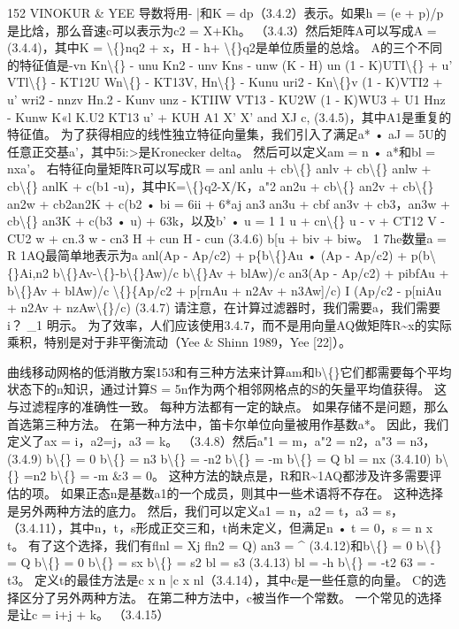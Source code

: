 \documentclass[UTF8,11pt,a4paper,openany,fontset=fandol]{ctexbook}
\begin{document}
152 VINOKUR \& YEE 导数将用- |和K = dp（3.4.2）表示。如果h = (e + p)/p是比焓，那么音速c可以表示为c2 = X+Kh。 （3.4.3）然后矩阵A可以写成A = (3.4.4)，其中K = \textbackslash\{\}nq2 + x，H - h+ \textbackslash\{\}q2是单位质量的总焓。 A的三个不同的特征值是-vn Kn\textbackslash\{\} - unu Kn2 - unv Kns - unw (K - H) un (1 - K)UTI\textbackslash\{\} + u' VTl\textbackslash\{\} - KT12U Wn\textbackslash\{\} - KT13V, Hn\textbackslash\{\} - Kunu uri2 - Kn\textbackslash\{\}v (1 - K)VTI2 + u' wri2 - nnzv Hn.2 - Kunv unz - KTIIW VT13 - KU2W (1 - K)WU3 + U1 Hnz - Kunw K«l K.U2 KT13 u' + KUH A1 X' X' and XJ c, (3.4.5)，其中A1是重复的特征值。 为了获得相应的线性独立特征向量集，我们引入了满足a* • aJ = 5U的任意正交基a'，其中5i:>是Kronecker delta。 然后可以定义am = n • a*和bl = nxa'。 右特征向量矩阵R可以写成R = anl anlu + cb\textbackslash\{\} anlv + cb\textbackslash\{\} anlw + cb\textbackslash\{\} anlK + c(b1 -u)，其中K=\textbackslash\{\}q2-X/K，a"2 an2u + cb\textbackslash\{\} an2v + cb\textbackslash\{\} an2w + cb2an2K + c(b2 • bi = 6ii + 6*aj an3 an3u + cbf an3v + cb3，an3w + cb\textbackslash\{\} an3K + c(b3 • u) + 63k，以及b' • u = 1 1 u + cn\textbackslash\{\} u - v + CT12 V - CU2 w + cn.3 w - cn3 H + cun H - cun (3.4.6) b[u + biv + biw。 1 7he数量a = R 1AQ最简单地表示为a anl(Ap - Ap/c2) + p\{b\textbackslash\{\}Au • (Ap - Ap/c2) + p(b\textbackslash\{\}Ai,n2 b\textbackslash\{\}Av-\textbackslash\{\}-b\textbackslash\{\}Aw)/c b\textbackslash\{\}Av + blAw)/c an3(Ap - Ap/c2) + pibfAu + b\textbackslash\{\}Av + blAw)/c \textbackslash\{\}\{Ap/c2 + p[rnAu + n2Av + n3Aw]/c) I (Ap/c2 - p[niAu + n2Av + nzAw\textbackslash\{\}/c) (3.4.7) 请注意，在计算过滤器时，我们需要a，我们需要i？ \_1 明示。 为了效率，人们应该使用3.4.7，而不是用向量AQ做矩阵R\textasciitilde{}x的实际乘积，特别是对于非平衡流动（Yee \& Shinn 1989，Yee [22]）。

曲线移动网格的低消散方案153和有三种方法来计算am和b\textbackslash\{\}它们都需要每个平均状态下的n知识，通过计算S = 5n作为两个相邻网格点的S的矢量平均值获得。 这与过滤程序的准确性一致。 每种方法都有一定的缺点。 如果存储不是问题，那么首选第三种方法。 在第一种方法中，笛卡尔单位向量被用作基数a*。 因此，我们定义了ax = i，a2=j，a3 = k。 （3.4.8）然后a"1 = m，a"2 = n2，a"3 = n3，(3.4.9) b\textbackslash\{\} = 0 b\textbackslash\{\} = n3 b\textbackslash\{\} = -n2 b\textbackslash\{\} = -m b\textbackslash\{\} = Q bl = nx (3.4.10) b\textbackslash\{\} =n2 b\textbackslash\{\} = -m \&3 = 0。 这种方法的缺点是，R和R\textasciitilde{}1AQ都涉及许多需要评估的项。 如果正态n是基数a1的一个成员，则其中一些术语将不存在。 这种选择是另外两种方法的底力。 然后，我们可以定义a1 = n，a2 = t，a3 = s，（3.4.11），其中n，t，s形成正交三和，t尚未定义，但满足n • t = 0，s = n x t。 有了这个选择，我们有flnl = Xj fln2 = Q) an3 = \textasciicircum{} (3.4.12)和b\textbackslash\{\} = 0 b\textbackslash\{\} = Q b\textbackslash\{\} = 0 b\textbackslash\{\} = sx b\textbackslash\{\} = s2 bl = s3 (3.4.13) bl = -h b\textbackslash\{\} = -t2 63 = -t3。 定义t的最佳方法是c x n |c x nl（3.4.14），其中c是一些任意的向量。 C的选择区分了另外两种方法。 在第二种方法中，c被当作一个常数。 一个常见的选择是让c = i+j + k。 （3.4.15）
\end{document}
